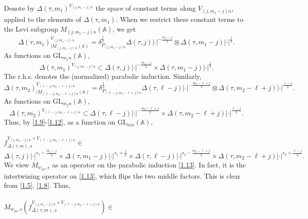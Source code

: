 \documentclass[12pts]{amsart}
\newcommand{\BA}{{\mathbb {A}}}
\newcommand{\GL}{{\mathrm{GL}}}
\begin{document}
Denote by $\Delta(\tau,m_1)^{V_{(j,m_1-j)n}}$ the space of constant terms along $V_{(j,m_1-j)n}$, applied to the elements of $\Delta(\tau,m_1)$. When we restrict these constant terms to the Levi subgroup $M_{(j,m_1-j)n}(\BA)$, we get 
\begin{equation}\label{1.9}
\Delta(\tau,m_1)^{V_{(j,m_1-j)n}}_{|M_{(j,m_1-j)n}(\BA)}=\delta^{\frac{1}{2}}_{P_{(j,m_1-j)n}}\Delta(\tau,j)|\cdot|^{-\frac{m_1-j}{2}}\otimes \Delta(\tau,m_1-j)|\cdot|^{\frac{j}{2}}.
\end{equation}
As functions on $\GL_{m_1n}(\BA)$,
\begin{equation}\label{1.10}
\Delta(\tau,m_1)^{V_{(j,m_1-j)n}}\subset \Delta(\tau,j)|\cdot|^{-\frac{m_1-j}{2}}\times \Delta(\tau,m_1-j)|\cdot|^{\frac{j}{2}}.
\end{equation}
The r.h.s. denotes the (normalized) parabolic induction.	Similarly,
\begin{equation}\label{1.11}
	\Delta(\tau,m_2)^{V_{(\ell-j,m_2-\ell+j)n}}_{|M_{(\ell-j,m_2-\ell+j)n}(\BA)}=\delta^{\frac{1}{2}}_{P_{(\ell-j,m_2-\ell+j)n}}\Delta(\tau,\ell-j)|\cdot|^{-\frac{m_2-\ell+j}{2}}\otimes \Delta(\tau,m_2-\ell+j)|\cdot|^{\frac{\ell-j}{2}}.
\end{equation}
As functions on $\GL_{m_2n}(\BA)$,
\begin{equation}\label{1.12}
	\Delta(\tau,m_2)^{V_{(\ell-j,m_2-\ell+j)n}}\subset \Delta(\tau,\ell-j)|\cdot|^{-\frac{m_2-\ell+j}{2}}\times \Delta(\tau,m_2-\ell+j)|\cdot|^{\frac{\ell-j}{2}}.
\end{equation}	    	
Thus, by \eqref{1.9}-\eqref{1.12}, as a function on $\GL_{mn}(\BA)$,\\
\\
$ f^{V_{(j,m_1-j)n}\times V_{(\ell-j,m_2-\ell+j)n}}_{\Delta(\tau,\underline{m}),\underline{s}}\in$
\\
\begin{equation}\label{1.13}
 \Delta(\tau,j)|\cdot|^{s_1-\frac{m_1-j}{2}}\times \Delta(\tau,m_1-j)|\cdot|^{s_1+\frac{j}{2}}\times \Delta(\tau,\ell-j)|\cdot|^{s_2-\frac{m_2-\ell+j}{2}}\times \Delta(\tau,m_2-\ell+j)|\cdot|^{s_2+\frac{\ell-j}{2}}.
\end{equation}
We view $M_{w_{jn},\underline{s}}$ as an operator on the parabolic induction \eqref{1.13}. In fact, it is the intertwining operator on \eqref{1.13}, which flips the two middle factors. This is clear from \eqref{1.5}, \eqref{1.8}. Thus,\\
\\
$ M_{w_{jn},\underline{s}}(f^{V_{(j,m_1-j)n}\times V_{(\ell-j,m_2-\ell+j)n}}_{\Delta(\tau,\underline{m}),\underline{s}})\in$
\end{document}
